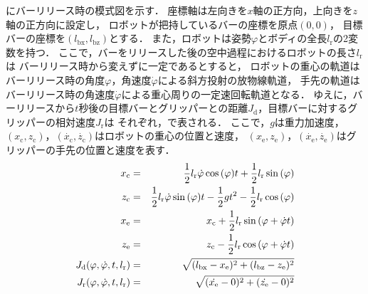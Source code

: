           \figref{}にバーリリース時の模式図を示す．
          座標軸は左向きを$x$軸の正方向，上向きを$z$軸の正方向に設定し，
          ロボットが把持しているバーの座標を原点$(0,0)$，
          目標バーの座標を$(l_{\mathrm{bx}},l_{\mathrm{bz}})$とする．
          また，ロボットは姿勢$\varphi$とボディの全長$l_{\mathrm{r}}$の2変数を持つ．
          ここで，バーをリリースした後の空中過程におけるロボットの長さ$l_{\mathrm{r}}$は
          バーリリース時から変えずに一定であるとすると， 
          ロボットの重心の軌道はバーリリース時の角度$\varphi$，角速度$\dot{\varphi}$による斜方投射の放物線軌道，
          手先の軌道はバーリリース時の角速度$\dot{\varphi}$による重心周りの一定速回転軌道となる．
          ゆえに，バーリリースから$t$秒後の目標バーとグリッパーとの距離$J_{\mathrm{d}}$，目標バーに対するグリッパーの相対速度$J_{\mathrm{r}}$は
          それぞれ，で表される．
          ここで，$g$は重力加速度，$(x_{\mathrm{c}},z_{\mathrm{c}})$，$(\dot{x_{\mathrm{c}}},\dot{z_{\mathrm{c}}})$はロボットの重心の位置と速度，
          $(x_{\mathrm{e}},z_{\mathrm{e}})$，$(\dot{x_{\mathrm{e}}},\dot{z_{\mathrm{e}}})$はグリッパーの手先の位置と速度を表す．
          \begin{eqnarray}
            \equlabel{x-c}
            x_{\mathrm{c}}&=&\frac{1}{2}l_{\mathrm{r}}\dot{\varphi}\cos{(\varphi)}t+\frac{1}{2}l_{\mathrm{r}}\sin{(\varphi)}\\
            \equlabel{z-c}
            z_{\mathrm{c}}&=&\frac{1}{2}l_{\mathrm{r}}\dot{\varphi}\sin{(\varphi)}t-\frac{1}{2}gt^2-\frac{1}{2}l_{\mathrm{r}}\cos{(\varphi)}\\
            \equlabel{x-e}
            x_{\mathrm{e}}&=&x_{\mathrm{c}}+\frac{1}{2}l_{\mathrm{r}}\sin{(\varphi+\dot{\varphi}t)}\\
            \equlabel{z-e}
            z_{\mathrm{e}}&=&z_{\mathrm{c}}-\frac{1}{2}l_{\mathrm{r}}\cos{(\varphi+\dot{\varphi}t)}\\
            \equlabel{Jd}
              J_{\mathrm{d}}(\varphi,\dot{\varphi},t,l_{\mathrm{r}})
              &=&\sqrt{(l_{\mathrm{bx}}-x_{\mathrm{e}})^2+(l_{\mathrm{bz}}-z_{\mathrm{e}})^2}\\
            \equlabel{Jr}
            J_{\mathrm{r}}(\varphi,\dot{\varphi},t,l_{\mathrm{r}})
            &=&\sqrt{(\dot{x_{\mathrm{e}}}-0)^2+(\dot{z_{\mathrm{e}}}-0)^2}\\
          \end{eqnarray}  
    
